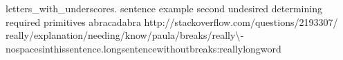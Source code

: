 \documentclass{article}
\begin{document}
\begin{multicols}{3}
letters\_with\_underscores.
sentence example second undesired determining required primitives abracadabra http://stackoverflow.com/questions/2193307/
really\fshyp{}explanation\fshyp{}needing\fshyp{}know\fshyp{}paula\fshyp{}breaks\fshyp{}really\bshyp{}nospacesinthissentence.longsentencewithoutbreaks\colonhyp{}reallylongword

\lipsum

\end{multicols}
\end{document}
